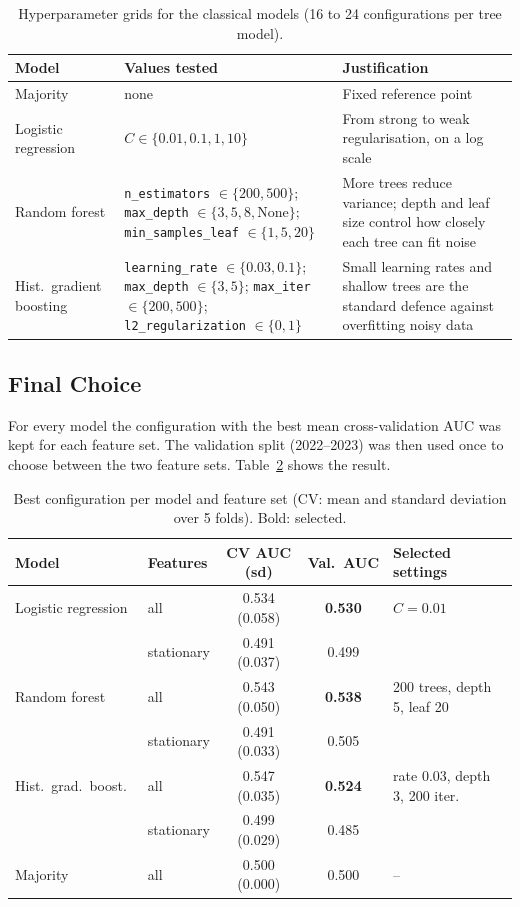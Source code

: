 \begin{table}[H]
  \centering
  \small
  \begin{tabular}{p{2.2cm}p{4.3cm}p{6.6cm}}
    \toprule
    Model & Values tested & Justification \\
    \midrule
    Majority & none & Fixed reference point \\
    Logistic regression & $C \in \{0.01, 0.1, 1, 10\}$ & From strong to weak regularisation, on a log scale \\
    Random forest & \texttt{n\_estimators} $\in \{200, 500\}$; \texttt{max\_depth} $\in \{3, 5, 8, \text{None}\}$; \texttt{min\_samples\_leaf} $\in \{1, 5, 20\}$ & More trees reduce variance; depth and leaf size control how closely each tree can fit noise \\
    Hist.\ gradient boosting & \texttt{learning\_rate} $\in \{0.03, 0.1\}$; \texttt{max\_depth} $\in \{3, 5\}$; \texttt{max\_iter} $\in \{200, 500\}$; \texttt{l2\_regularization} $\in \{0, 1\}$ & Small learning rates and shallow trees are the standard defence against overfitting noisy data \\
    \bottomrule
  \end{tabular}
  \caption{Hyperparameter grids for the classical models (16 to 24 configurations per tree model).}
  \label{tab:classical-grid}
\end{table}

\subsection{Final Choice}

For every model the configuration with the best mean cross-validation AUC was
kept for each feature set. The validation split (2022--2023) was then used once
to choose between the two feature sets. Table~\ref{tab:classical-selected}
shows the result.

\begin{table}[H]
  \centering
  \small
  \begin{tabular}{llccl}
    \toprule
    Model & Features & CV AUC (sd) & Val.\ AUC & Selected settings \\
    \midrule
    Logistic regression & all        & 0.534 (0.058) & \textbf{0.530} & $C = 0.01$ \\
                        & stationary & 0.491 (0.037) & 0.499 & \\
    Random forest       & all        & 0.543 (0.050) & \textbf{0.538} & 200 trees, depth 5, leaf 20 \\
                        & stationary & 0.491 (0.033) & 0.505 & \\
    Hist.\ grad.\ boost.\ & all      & 0.547 (0.035) & \textbf{0.524} & rate 0.03, depth 3, 200 iter. \\
                        & stationary & 0.499 (0.029) & 0.485 & \\
    Majority            & all        & 0.500 (0.000) & 0.500 & -- \\
    \bottomrule
  \end{tabular}
  \caption{Best configuration per model and feature set (CV: mean and standard deviation over 5 folds). Bold: selected.}
  \label{tab:classical-selected}
\end{table}

